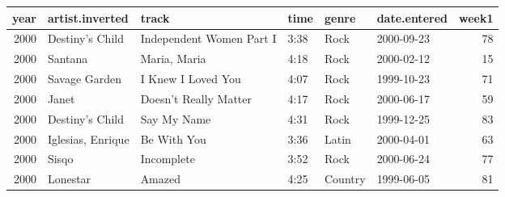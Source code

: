 \begin{tabular}{rlllllr}
  \toprule
 year & artist.inverted & track & time & genre & date.entered & week1 \\ 
  \midrule
  2000 & Destiny's Child & Independent Women Part I & 3:38 & Rock & 2000-09-23 &  78 \\ 
  2000 & Santana & Maria, Maria & 4:18 & Rock & 2000-02-12 &  15 \\ 
  2000 & Savage Garden & I Knew I Loved You & 4:07 & Rock & 1999-10-23 &  71 \\ 
  2000 & Janet & Doesn't Really Matter & 4:17 & Rock & 2000-06-17 &  59 \\ 
  2000 & Destiny's Child & Say My Name & 4:31 & Rock & 1999-12-25 &  83 \\ 
  2000 & Iglesias, Enrique & Be With You & 3:36 & Latin & 2000-04-01 &  63 \\ 
  2000 & Sisqo & Incomplete & 3:52 & Rock & 2000-06-24 &  77 \\ 
  2000 & Lonestar & Amazed & 4:25 & Country & 1999-06-05 &  81 \\ 
   \bottomrule
\end{tabular}
